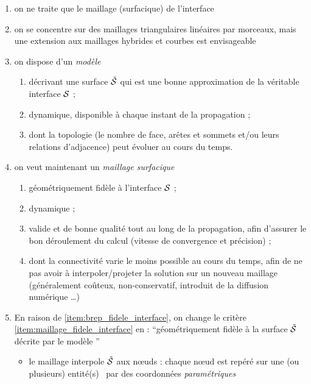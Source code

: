 \begin{enumerate}
	\item on ne traite que le maillage (surfacique) de l'interface
	\item on se concentre sur des maillages triangulaires linéaires par morceaux, mais une extension aux maillages hybrides et courbes est envisageable
	\item on dispose d'un \textit{modèle \brep}
	\begin{enumerate}[label=(\arabic*)]
	    \item décrivant une surface $\tilde{\mathcal{S}}$ qui est une bonne approximation de la véritable interface $\mathcal{S}$ ; \label{item:brep_fidele_interface}
	    \item dynamique, \ie disponible à chaque instant de la propagation ; \label{item:brep_dynamique}
	    \item dont la topologie (\ie le nombre de face, arêtes et sommets et/ou leurs relations d'adjacence) peut évoluer au cours du temps. \label{item:brep_topologie_variable}
	\end{enumerate}
	\item on veut maintenant un \textit{maillage surfacique}
	\begin{enumerate}[label=(\alph*)]
	    \item géométriquement fidèle à l'interface $\mathcal{S}$ ; \label{item:maillage_fidele_interface}
	    \item dynamique ; \label{item:maillage_dynamique}
	    \item valide et de bonne qualité tout au long de la propagation, afin d'assurer le bon déroulement du calcul (vitesse de convergence et précision) ; \label{item:maillage_qualite}
	    \item dont la connectivité varie le moins possible au cours du temps, afin de ne pas avoir à interpoler/projeter la solution sur un nouveau maillage (généralement coûteux, non-conservatif, introduit de la diffusion numérique \ldots) \label{item:maillage_connectivite_fixe}
	\end{enumerate}
	\item En raison de \ref{item:brep_fidele_interface}, on change le critère \ref{item:maillage_fidele_interface} en : ``géométriquement fidèle à la surface $\tilde{\mathcal{S}}$ décrite par le modèle \brep'' \label{item:maillage_fidele_surface_brep}
	\begin{itemize}[label=$\rightarrow$]
        \item le maillage interpole $\tilde{\mathcal{S}}$ aux n\oe uds : chaque n\oe ud est repéré sur une (ou plusieurs) entité(s) \brep\ par des coordonnées \textit{paramétriques}
        

\end{itemize}
\end{enumerate}
